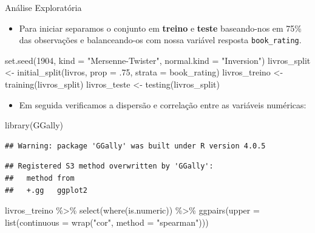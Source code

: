 \documentclass[
  9 pt,
  ignorenonframetext,
]{beamer}
\newenvironment{Shaded}{\begin{snugshade}}{\end{snugshade}}
\newcommand{\AttributeTok}[1]{\textcolor[rgb]{0.77,0.63,0.00}{#1}}
\newcommand{\DecValTok}[1]{\textcolor[rgb]{0.00,0.00,0.81}{#1}}
\newcommand{\FunctionTok}[1]{\textcolor[rgb]{0.00,0.00,0.00}{#1}}
\newcommand{\NormalTok}[1]{#1}
\newcommand{\OtherTok}[1]{\textcolor[rgb]{0.56,0.35,0.01}{#1}}
\newcommand{\SpecialCharTok}[1]{\textcolor[rgb]{0.00,0.00,0.00}{#1}}
\newcommand{\StringTok}[1]{\textcolor[rgb]{0.31,0.60,0.02}{#1}}
\providecommand{\tightlist}{%
  \setlength{\itemsep}{0pt}\setlength{\parskip}{0pt}}
\begin{document}
\begin{frame}[fragile]{Análise Exploratória}
\begin{itemize}
\tightlist
\item
  Para iniciar separamos o conjunto em \textbf{treino} e \textbf{teste}
  baseando-nos em 75\% das observações e balanceando-os com nossa
  variável resposta \texttt{book\_rating}.
\end{itemize}

\begin{Shaded}
\begin{Highlighting}[]
\FunctionTok{set.seed}\NormalTok{(}\DecValTok{1904}\NormalTok{, }\AttributeTok{kind =} \StringTok{"Mersenne{-}Twister"}\NormalTok{, }\AttributeTok{normal.kind =} \StringTok{"Inversion"}\NormalTok{)}
\NormalTok{livros\_split }\OtherTok{\textless{}{-}} \FunctionTok{initial\_split}\NormalTok{(livros, }\AttributeTok{prop =}\NormalTok{ .}\DecValTok{75}\NormalTok{, }\AttributeTok{strata =}\NormalTok{ book\_rating)}
\NormalTok{livros\_treino }\OtherTok{\textless{}{-}} \FunctionTok{training}\NormalTok{(livros\_split)}
\NormalTok{livros\_teste }\OtherTok{\textless{}{-}} \FunctionTok{testing}\NormalTok{(livros\_split)}
\end{Highlighting}
\end{Shaded}

\begin{itemize}
\tightlist
\item
  Em seguida verificamos a dispersão e correlação entre as variáveis
  numéricas:
\end{itemize}

\begin{Shaded}
\begin{Highlighting}[]
\FunctionTok{library}\NormalTok{(GGally)}
\end{Highlighting}
\end{Shaded}

\begin{verbatim}
## Warning: package 'GGally' was built under R version 4.0.5
\end{verbatim}

\begin{verbatim}
## Registered S3 method overwritten by 'GGally':
##   method from   
##   +.gg   ggplot2
\end{verbatim}

\begin{Shaded}
\begin{Highlighting}[]
\NormalTok{livros\_treino }\SpecialCharTok{\%\textgreater{}\%} 
  \FunctionTok{select}\NormalTok{(}\FunctionTok{where}\NormalTok{(is.numeric)) }\SpecialCharTok{\%\textgreater{}\%} 
  \FunctionTok{ggpairs}\NormalTok{(}\AttributeTok{upper =} \FunctionTok{list}\NormalTok{(}\AttributeTok{continuous =} \FunctionTok{wrap}\NormalTok{(}\StringTok{"cor"}\NormalTok{, }\AttributeTok{method =} \StringTok{"spearman"}\NormalTok{)))}
\end{Highlighting}
\end{Shaded}


\end{frame}
\end{document}
